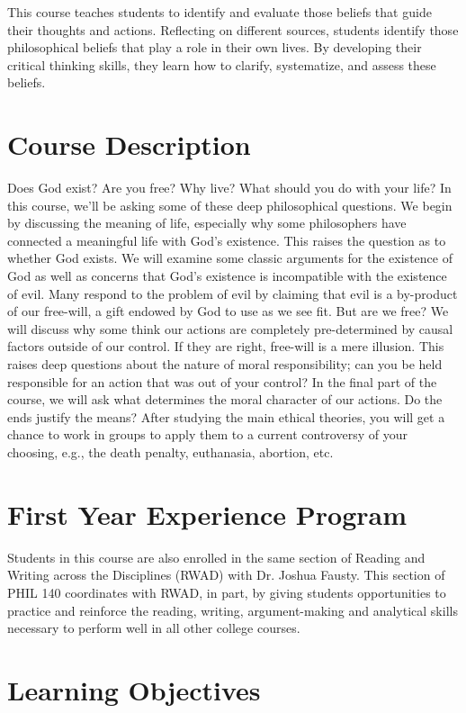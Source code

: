 \documentclass[11pt,article,oneside]{memoir}
\begin{document}
This course teaches students to identify and evaluate those beliefs that guide their thoughts and actions. Reflecting on different sources, students identify those philosophical beliefs that play a role in their own lives. By developing their critical thinking skills, they learn how to clarify, systematize, and assess these beliefs. 

\section{Course Description}

Does God exist? Are you free? Why live? What should you do with your life?  In this
course, we'll be asking some of these deep philosophical questions. We begin by discussing the meaning of life, especially why some philosophers have connected a meaningful life with God's existence. This raises the question as to whether God exists. We will examine some classic arguments for the existence of God as well as concerns that God's existence is incompatible with the existence of evil. Many respond to the problem of evil by claiming that evil is a by-product of our free-will, a gift endowed by God to use as we see fit. But are we free? We will discuss why some think our actions are completely pre-determined by causal factors outside of our control. If they are right, free-will is a mere illusion. This raises deep questions about the nature of moral responsibility; can you be held responsible for an action that was out of your control? In the final part of the course, we will ask what determines the moral character of our actions. Do the ends justify the means? After studying the main ethical theories, you will get a chance to work in groups to apply them to a current controversy of your choosing, e.g., the death penalty, euthanasia, abortion, etc.  

 \section{First Year Experience Program}
Students in this course are also enrolled in the same section of Reading and Writing across the Disciplines (RWAD) with Dr. Joshua Fausty.  This section of PHIL 140 coordinates with RWAD, in part, by giving students opportunities to practice and reinforce the reading, writing, argument-making and analytical skills necessary to perform well in all other college courses. 



\section{Learning Objectives}
\end{document}
